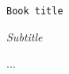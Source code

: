 \documentclass{book}
\begin{document}
\begin{titlepage}

\center
\texttt{\Huge Book title}

\textit{\Large Subtitle}


\end{titlepage}

...
\end{document}
